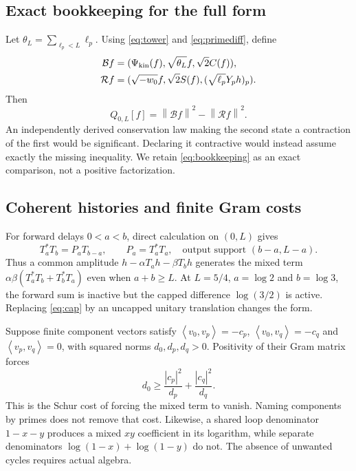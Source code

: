 \documentclass[11pt]{article}
\numberwithin{equation}{section}
\theoremstyle{definition}
\theoremstyle{remark}
\newcommand{\norm}[1]{\left\lVert#1\right\rVert}
\newcommand{\ip}[2]{\left\langle#1,#2\right\rangle}
\begin{document}
\subsection{Exact bookkeeping for the full form}
Let $\theta_L=\sum_{\ell_p<L}\ell_p$. Using \eqref{eq:tower} and \eqref{eq:primediff}, define
\begin{align}
 \mathcal Bf&=(\Psi_{\rm kin}(f),\sqrt{\theta_L}f,\sqrt2C(f)),\\
 \mathcal Rf&=(\sqrt{-w_0}f,\sqrt2S(f),(\sqrt{\ell_p}Y_ph)_p).
\end{align}
Then
\begin{equation}
 Q_{0,L}[f]=\norm{\mathcal Bf}^2-\norm{\mathcal Rf}^2.
 \label{eq:bookkeeping}
\end{equation}
An independently derived conservation law making the second state a contraction of the first would be significant. Declaring it contractive would instead assume exactly the missing inequality. We retain \eqref{eq:bookkeeping} as an exact comparison, not a positive factorization.

\subsection{Coherent histories and finite Gram costs}
For forward delays $0<a<b$, direct calculation on $(0,L)$ gives
\begin{equation}
 T_a^*T_b=P_aT_{b-a},\qquad P_a=T_a^*T_a,
 \quad\text{output support }(b-a,L-a).
 \label{eq:cap}
\end{equation}
Thus a common amplitude $h-\alpha T_ah-\beta T_bh$ generates the mixed term
$\alpha\beta(T_a^*T_b+T_b^*T_a)$ even when $a+b\ge L$. At $L=5/4$, $a=\log2$ and $b=\log3$, the forward sum is inactive but the capped difference $\log(3/2)$ is active. Replacing \eqref{eq:cap} by an uncapped unitary translation changes the form.

Suppose finite component vectors satisfy
$\ip{v_0}{v_p}=-c_p$, $\ip{v_0}{v_q}=-c_q$ and $\ip{v_p}{v_q}=0$, with squared norms $d_0,d_p,d_q>0$. Positivity of their Gram matrix forces
\begin{equation}
 d_0\ge\frac{|c_p|^2}{d_p}+\frac{|c_q|^2}{d_q}.
\end{equation}
This is the Schur cost of forcing the mixed term to vanish. Naming components by primes does not remove that cost. Likewise, a shared loop denominator $1-x-y$ produces a mixed $xy$ coefficient in its logarithm, while separate denominators $\log(1-x)+\log(1-y)$ do not. The absence of unwanted cycles requires actual algebra.
\end{document}
